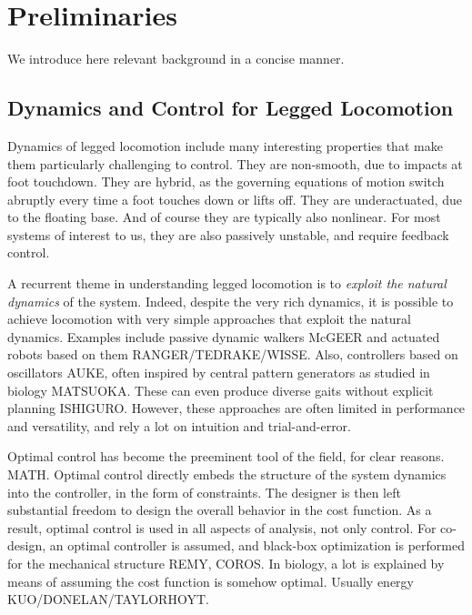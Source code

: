 
\chapter{Preliminaries}
We introduce here relevant background in a concise manner.

\section{Dynamics and Control for Legged Locomotion}
Dynamics of legged locomotion include many interesting properties that make them particularly challenging to control. They are non-smooth, due to impacts at foot touchdown. They are hybrid, as the governing equations of motion switch abruptly every time a foot touches down or lifts off. They are underactuated, due to the floating base. And of course they are typically also nonlinear. For most systems of interest to us, they are also passively unstable, and require feedback control. \par

A recurrent theme in understanding legged locomotion is to \emph{exploit the natural dynamics} of the system. Indeed, despite the very rich dynamics, it is possible to achieve locomotion with very simple approaches that exploit the natural dynamics.
Examples include passive dynamic walkers McGEER and actuated robots based on them RANGER/TEDRAKE/WISSE.
Also, controllers based on oscillators AUKE, often inspired by central pattern generators as studied in biology MATSUOKA. These can even produce diverse gaits without explicit planning ISHIGURO.
However, these approaches are often limited in performance and versatility, and rely a lot on intuition and trial-and-error. \par

Optimal control has become the preeminent tool of the field, for clear reasons.  MATH. Optimal control directly embeds the structure of the system dynamics into the controller, in the form of constraints. The designer is then left substantial freedom to design the overall behavior in the cost function. As a result, optimal control is used in all aspects of analysis, not only control. For co-design, an optimal controller is assumed, and black-box optimization is performed for the mechanical structure REMY, COROS. In biology, a lot is explained by means of assuming the cost function is somehow optimal. Usually energy KUO/DONELAN/TAYLORHOYT. \par

